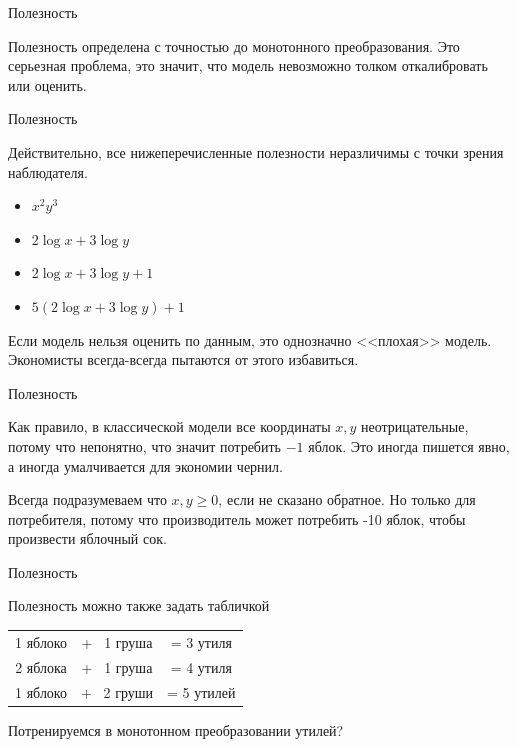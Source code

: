 \documentclass{beamer}
\begin{document}
\begin{frame}{Полезность}

Полезность определена с точностью до монотонного преобразования. Это серьезная проблема, это значит, что модель невозможно толком \alert{откалибровать} или \alert{оценить}.

\end{frame}

\begin{frame}{Полезность}

Действительно, все нижеперечисленные полезности неразличимы с точки зрения наблюдателя. 
\begin{itemize}
\item $x^2 y^3$
\item $2 \log x + 3 \log y$
\item $2 \log x + 3 \log y + 1$
\item $5(2 \log x + 3 \log y) + 1$
\end{itemize}

Если модель нельзя оценить по данным, это однозначно <<плохая>> модель. Экономисты всегда-всегда пытаются от этого избавиться.

\end{frame}

\begin{frame}{Полезность}

Как правило, в классической модели все координаты $x,y$ неотрицательные, потому что непонятно, что значит потребить $-1$ яблок. Это иногда пишется явно, а иногда умалчивается для экономии чернил. 

Всегда подразумеваем что $x,y \geqslant 0$, если не сказано обратное. Но только для потребителя, потому что производитель может потребить -10 яблок, чтобы произвести яблочный сок.

\end{frame}

\begin{frame}{Полезность}

Полезность можно также задать табличкой

\begin{center}
\begin{tabular}{ |c c c| } 
 \hline
 1 яблоко&+ \ 1 груша & = 3 утиля \\ 
 2 яблока&+ \ 1 груша & = 4 утиля \\ 
 1 яблоко&+ \ 2 груши & = 5 утилей \\ 
 \hline
\end{tabular}
\end{center}

Потренируемся в монотонном преобразовании утилей?

\end{frame}
\end{document}
